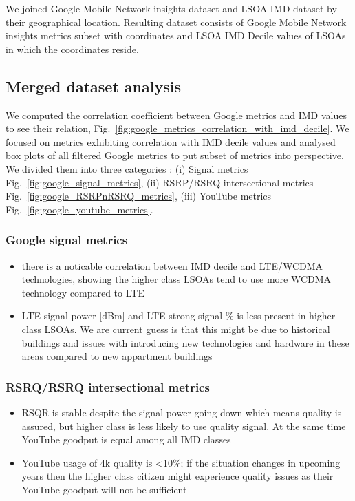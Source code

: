 We joined Google Mobile Network insights dataset and LSOA IMD dataset by their geographical location. Resulting dataset consists of Google Mobile Network insights metrics subset with coordinates and LSOA IMD Decile values of LSOAs in which the coordinates reside.

\subsection{Merged dataset analysis}

We computed the correlation coefficient between Google metrics and IMD values to see their relation, Fig.~\ref{fig:google_metrics_correlation_with_imd_decile}. We focused on metrics exhibiting correlation with IMD decile values and analysed box plots of all filtered Google metrics to put subset of metrics into perspective. We divided them into three categories : (i) Signal metrics Fig.~\ref{fig:google_signal_metrics}, (ii) RSRP/RSRQ intersectional metrics Fig.~\ref{fig:google_RSRPnRSRQ_metrics}, (iii) YouTube metrics Fig.~\ref{fig:google_youtube_metrics}.

\subsubsection{Google signal metrics}
\begin{itemize}[noitemsep]
\item there is a noticable correlation between IMD decile and LTE/WCDMA technologies, showing the higher class LSOAs tend to use more WCDMA technology compared to LTE
\item LTE signal power [dBm] and LTE strong signal \% is less present in higher class LSOAs. We are current guess is that this might be due to historical buildings and issues with introducing new technologies and hardware in these areas compared to new appartment buildings
\end{itemize}

\subsubsection{RSRQ/RSRQ intersectional metrics}
\begin{itemize}[noitemsep]
\item RSQR is stable despite the signal power going down which means quality is assured, but higher class is less likely to use quality signal. At the same time YouTube goodput is equal among all IMD classes
\item YouTube usage of 4k quality is <10\%; if the situation changes in upcoming years then the higher class citizen might experience quality issues as their YouTube goodput will not be sufficient
\end{itemize}

